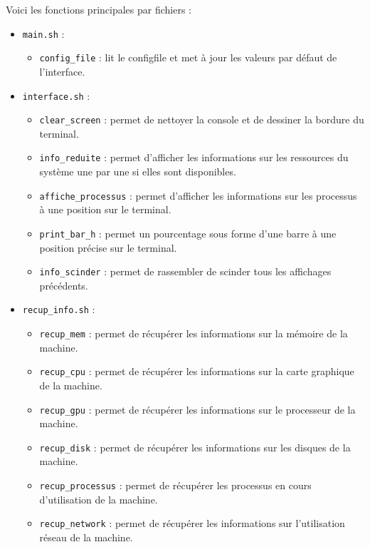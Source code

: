 \documentclass{article}
\begin{document}
Voici les fonctions principales par fichiers :
\begin{itemize}
    \item \texttt{main.sh} :
        \begin{itemize}[label=\textbullet]
            \item \texttt{config\_file} : lit le configfile et met à jour les valeurs par défaut de l'interface.
        \end{itemize}
    \vspace{0.3em}
    \item \texttt{interface.sh} :
        \begin{itemize}[label=\textbullet]
            \item {\texttt{clear\_screen}} : permet de nettoyer la console et de dessiner la bordure du terminal.
            \item \texttt{info\_reduite} : permet d'afficher les informations sur les ressources du système une par une si elles sont disponibles.
            \item \texttt{affiche\_processus} : permet d'afficher les informations sur les processus à une position sur le terminal.
            \item \texttt{print\_bar\_h} : permet un pourcentage sous forme d'une barre à une position précise sur le terminal.
            \item \texttt{info\_scinder} : permet de rassembler de scinder tous les affichages précédents.
        \end{itemize}
        \vspace{0.3em}
    \item \texttt{recup\_info.sh} :
        \begin{itemize}[label=\textbullet]
            \item \texttt{recup\_mem} : permet de récupérer les informations sur la mémoire de la machine.
            \item \texttt{recup\_cpu} : permet de récupérer les informations sur la carte graphique de la machine.
            \item \texttt{recup\_gpu} : permet de récupérer les informations sur le processeur de la machine.
            \item \texttt{recup\_disk} : permet de récupérer les informations sur les disques de la machine.
            \item \texttt{recup\_processus} : permet de récupérer les processus en cours d'utilisation de la machine.
            \item \texttt{recup\_network} : permet de récupérer les informations sur l'utilisation réseau de la machine.

\end{itemize}
\end{itemize}
\end{document}
